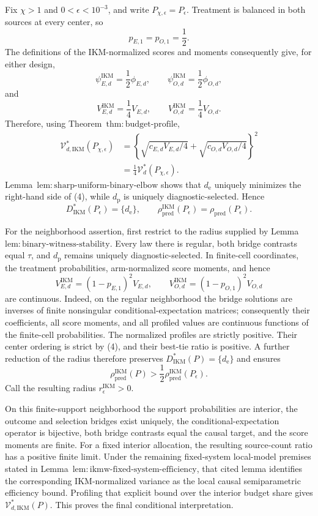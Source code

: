 Fix \(\chi>1\) and \(0<\epsilon<10^{-3}\), and write \(P_{\chi,\epsilon}=P_\epsilon\). Treatment is balanced in both sources at every center, so
\[
 p_{E,1}=p_{O,1}=\frac12.                              \tag{1}
\]
The definitions of the IKM-normalized scores and moments consequently give, for either design,
\[
 \psi_{E,d}^{\mathrm{IKM}}=\frac12\phi_{E,d},
 \qquad
 \psi_{O,d}^{\mathrm{IKM}}=\frac12\phi_{O,d},          \tag{2}
\]
and
\[
 V_{E,d}^{\mathrm{IKM}}=\frac14V_{E,d},
 \qquad
 V_{O,d}^{\mathrm{IKM}}=\frac14V_{O,d}.                \tag{3}
\]
Therefore, using Theorem~\(\mathrm{thm{:}budget\text{-}profile}\),
\[
\begin{aligned}
 \mathcal V_{d,\mathrm{IKM}}^*(P_{\chi,\epsilon})
 &=\left\{\sqrt{c_{E,d}V_{E,d}/4}
 +\sqrt{c_{O,d}V_{O,d}/4}\right\}^2\\
 &=\frac14\mathcal V_d^*(P_{\chi,\epsilon}).           \tag{4}
\end{aligned}
\]
Lemma~\(\mathrm{lem{:}sharp\text{-}uniform\text{-}binary\text{-}elbow}\) shows that \(d_{\mathrm e}\) uniquely minimizes the right-hand side of (4), while \(d_{\mathrm p}\) is uniquely diagnostic-selected. Hence
\[
 D_{\mathrm{IKM}}^*(P_\epsilon)=\{d_{\mathrm e}\},
 \qquad
 \rho_{\mathrm{pred}}^{\mathrm{IKM}}(P_\epsilon)
 =\rho_{\mathrm{pred}}(P_\epsilon).                   \tag{5}
\]

For the neighborhood assertion, first restrict to the radius supplied by Lemma~\(\mathrm{lem{:}binary\text{-}witness\text{-}stability}\). Every law there is regular, both bridge contrasts equal \(\tau\), and \(d_{\mathrm p}\) remains uniquely diagnostic-selected. In finite-cell coordinates, the treatment probabilities, arm-normalized score moments, and hence
\[
 V_{E,d}^{\mathrm{IKM}}=(1-p_{E,1})^2V_{E,d},
 \qquad
 V_{O,d}^{\mathrm{IKM}}=(1-p_{O,1})^2V_{O,d}           \tag{6}
\]
are continuous. Indeed, on the regular neighborhood the bridge solutions are inverses of finite nonsingular conditional-expectation matrices; consequently their coefficients, all score moments, and all profiled values are continuous functions of the finite-cell probabilities. The normalized profiles are strictly positive. Their center ordering is strict by (4), and their best-tie ratio is positive. A further reduction of the radius therefore preserves \(D_{\mathrm{IKM}}^*(P)=\{d_{\mathrm e}\}\) and ensures
\[
 \rho_{\mathrm{pred}}^{\mathrm{IKM}}(P)
 >\frac12\rho_{\mathrm{pred}}^{\mathrm{IKM}}(P_\epsilon).
\]
Call the resulting radius \(r_\epsilon^{\mathrm{IKM}}>0\).

On this finite-support neighborhood the support probabilities are interior, the outcome and selection bridges exist uniquely, the conditional-expectation operator is bijective, both bridge contrasts equal the causal target, and the score moments are finite. For a fixed interior allocation, the resulting source-count ratio has a positive finite limit. Under the remaining fixed-system local-model premises stated in Lemma~\(\mathrm{lem{:}ikmw\text{-}fixed\text{-}system\text{-}efficiency}\), that cited lemma identifies the corresponding IKM-normalized variance as the local causal semiparametric efficiency bound. Profiling that explicit bound over the interior budget share gives \(\mathcal V_{d,\mathrm{IKM}}^*(P)\). This proves the final conditional interpretation.